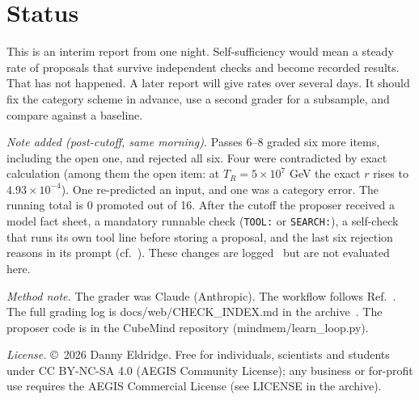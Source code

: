 \documentclass[aps,prd,twocolumn,superscriptaddress,nofootinbib,showkeys]{revtex4-2}
\begin{document}
\section{Status}
This is an interim report from one night. Self-sufficiency would mean a steady rate of proposals that survive independent checks and become recorded results. That has not happened. A later report will give rates over several days. It should fix the category scheme in advance, use a second grader for a subsample, and compare against a baseline.

\emph{Note added (post-cutoff, same morning).} Passes 6--8 graded six more items, including the open one, and rejected all six. Four were contradicted by exact calculation (among them the open item: at $T_R=5\times10^7$ GeV the exact $r$ rises to $4.93\times10^{-4}$). One re-predicted an input, and one was a category error. The running total is 0 promoted out of 16. After the cutoff the proposer received a model fact sheet, a mandatory runnable check (\texttt{TOOL:} or \texttt{SEARCH:}), a self-check that runs its own tool line before storing a proposal, and the last six rejection reasons in its prompt (cf.~\cite{Reflexion}). These changes are logged~\cite{AEGIS} but are not evaluated here.

\emph{Method note.} The grader was Claude (Anthropic). The workflow follows Ref.~\cite{P4}. The full grading log is docs/web/CHECK\_INDEX.md in the archive~\cite{AEGIS}. The proposer code is in the CubeMind repository (mindmem/learn\_loop.py).

\emph{License.} \copyright~2026 Danny Eldridge. Free for individuals, scientists and students under CC BY-NC-SA 4.0 (AEGIS Community License); any business or for-profit use requires the AEGIS Commercial License (see LICENSE in the archive).
\end{document}
